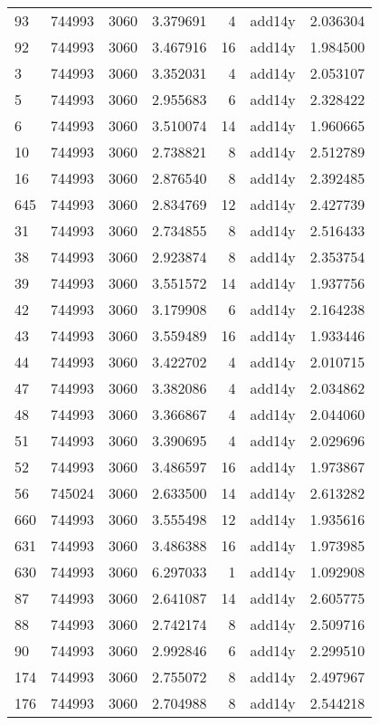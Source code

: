\begin{tabular}{lrrrrlr}
93 & 744993 & 3060 & 3.379691 & 4 & add14y & 2.036304 \\
92 & 744993 & 3060 & 3.467916 & 16 & add14y & 1.984500 \\
3 & 744993 & 3060 & 3.352031 & 4 & add14y & 2.053107 \\
5 & 744993 & 3060 & 2.955683 & 6 & add14y & 2.328422 \\
6 & 744993 & 3060 & 3.510074 & 14 & add14y & 1.960665 \\
10 & 744993 & 3060 & 2.738821 & 8 & add14y & 2.512789 \\
16 & 744993 & 3060 & 2.876540 & 8 & add14y & 2.392485 \\
645 & 744993 & 3060 & 2.834769 & 12 & add14y & 2.427739 \\
31 & 744993 & 3060 & 2.734855 & 8 & add14y & 2.516433 \\
38 & 744993 & 3060 & 2.923874 & 8 & add14y & 2.353754 \\
39 & 744993 & 3060 & 3.551572 & 14 & add14y & 1.937756 \\
42 & 744993 & 3060 & 3.179908 & 6 & add14y & 2.164238 \\
43 & 744993 & 3060 & 3.559489 & 16 & add14y & 1.933446 \\
44 & 744993 & 3060 & 3.422702 & 4 & add14y & 2.010715 \\
47 & 744993 & 3060 & 3.382086 & 4 & add14y & 2.034862 \\
48 & 744993 & 3060 & 3.366867 & 4 & add14y & 2.044060 \\
51 & 744993 & 3060 & 3.390695 & 4 & add14y & 2.029696 \\
52 & 744993 & 3060 & 3.486597 & 16 & add14y & 1.973867 \\
56 & 745024 & 3060 & 2.633500 & 14 & add14y & 2.613282 \\
660 & 744993 & 3060 & 3.555498 & 12 & add14y & 1.935616 \\
631 & 744993 & 3060 & 3.486388 & 16 & add14y & 1.973985 \\
630 & 744993 & 3060 & 6.297033 & 1 & add14y & 1.092908 \\
87 & 744993 & 3060 & 2.641087 & 14 & add14y & 2.605775 \\
88 & 744993 & 3060 & 2.742174 & 8 & add14y & 2.509716 \\
90 & 744993 & 3060 & 2.992846 & 6 & add14y & 2.299510 \\
174 & 744993 & 3060 & 2.755072 & 8 & add14y & 2.497967 \\
176 & 744993 & 3060 & 2.704988 & 8 & add14y & 2.544218 \\

\end{tabular}
